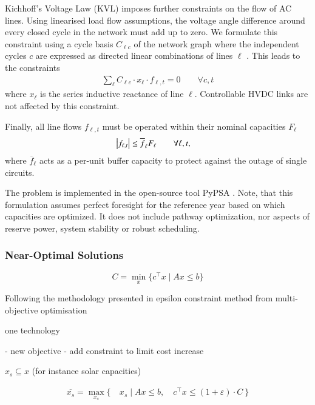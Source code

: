 Kichhoff's Voltage Law (KVL) imposes further constraints on the flow of AC lines.
Using linearised load flow assumptions, the voltage angle difference around every closed cycle in the
network must add up to zero. We formulate this constraint using a cycle basis $C_{\ell c}$
of the network graph where the independent cycles $c$ are expressed as
directed linear combinations of lines $\ell$ \cite{cycleflows}.
This leads to the constraints
\begin{align}
    \sum_\ell C_{\ell c} \cdot x_\ell \cdot f_{\ell,t} = 0 \qquad\forall c,t
\end{align}
where $x_\ell$ is the series inductive reactance of line $\ell$.
Controllable HVDC links are not affected by this constraint.

Finally, all line flows $f_{\ell,t}$ must be operated within their nominal capacities $F_\ell$
\begin{align}
    \left|f_{\ell,t}\right| \leq \overline{f}_{\ell} F_{\ell} & \qquad\forall \ell, t,
    \label{eq:lastA}
\end{align}
where $\overline{f}_\ell$ acts as a per-unit buffer capacity
to protect against the outage of single circuits.

The problem is implemented in the open-source tool PyPSA \cite{pypsa}.
Note, that this formulation assumes perfect foresight for the reference year based on which capacities are optimized.
It does not include pathway optimization, nor aspects of reserve power, system stability or robust scheduling.

\subsubsection{Near-Optimal Solutions}

\begin{equation}
    C = \min_x\{c^\top x \mid Ax\leq b\}
\end{equation}

Following the methodology presented in \cite{nearoptimal}
epsilon constraint method from multi-objective optimisation \cite{mavrotas_effective_2009}

one technology

- new objective
- add constraint to limit cost increase

$x_s\subseteq x$ (for instance solar capacities)

\begin{align}
    \overline{x_s} = \max_{x_s}\{\:&x_s \mid Ax\leq b,\quad c^\top x\leq (1+\varepsilon)\cdot C \:\}
\end{align}

